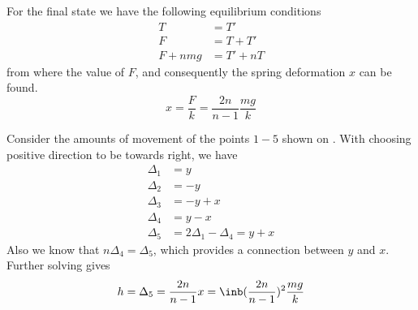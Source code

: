 For the final state  we have the following equilibrium conditions
\begin{equation}
\begin{split}
    T &= T' \\
    F &= T + T' \\
    F + nmg &= T' + nT
\end{split}
\end{equation}
from where the value of $F$, and consequently
the spring deformation $x$ can be found.
\begin{equation}
    x = \frac{F}{k} = \frac{2n}{n - 1} \frac{mg}{k}
\end{equation}

Consider the amounts of movement of the points $1-5$ shown on .
With choosing positive direction to be towards right, we have
\begin{equation}
\begin{split}
    \Delta_1 &= y \\
    \Delta_2 &= -y \\
    \Delta_3 &= -y + x \\
    \Delta_4 &= y - x \\
    \Delta_5 &= 2 \Delta_1 - \Delta_4 = y + x
\end{split}
\end{equation}
Also we know that $n \Delta_4 = \Delta_5$,
which provides a connection between $y$ and $x$.
Further solving gives
\begin{equation}
    h = \Delta_5 = \frac{2n}{n - 1} x = \inb({\frac{2n}{n - 1}})^2 \frac{mg}{k}
\end{equation}
